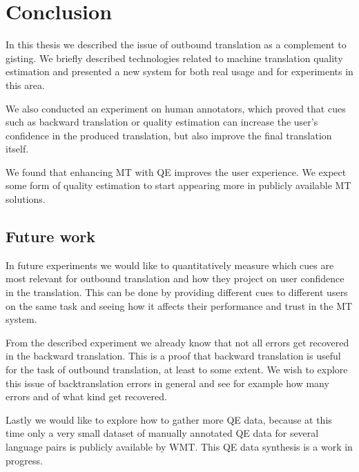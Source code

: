 \chapter*{Conclusion}

In this thesis we described the issue of outbound translation as a complement to gisting. We briefly described technologies related to machine translation quality estimation and presented a new system \ptakopet{} for both real usage and for experiments in this area.

We also conducted an experiment on human annotators, which proved that cues such as backward translation or quality estimation can increase the user's confidence in the produced translation, but also improve the final translation itself. 

We found that enhancing MT with QE improves the user experience. We expect some form of quality estimation to start appearing more in publicly available MT solutions.

\section*{Future work}

In future experiments we would like to quantitatively measure which cues are most relevant for outbound translation and how they project on user confidence in the translation. This can be done by providing different cues to different users on the same task and seeing how it affects their performance and trust in the MT system.

From the described experiment we already know that not all errors get recovered in the backward translation. This is a proof that backward translation is useful for the task of outbound translation, at least to some extent. We wish to explore this issue of backtranslation errors in general and see for example how many errors and of what kind get recovered.

Lastly we would like to explore how to gather more QE data, because at this time only a very small dataset of manually annotated QE data for several language pairs is publicly available by WMT. This QE data synthesis is a work in progress.